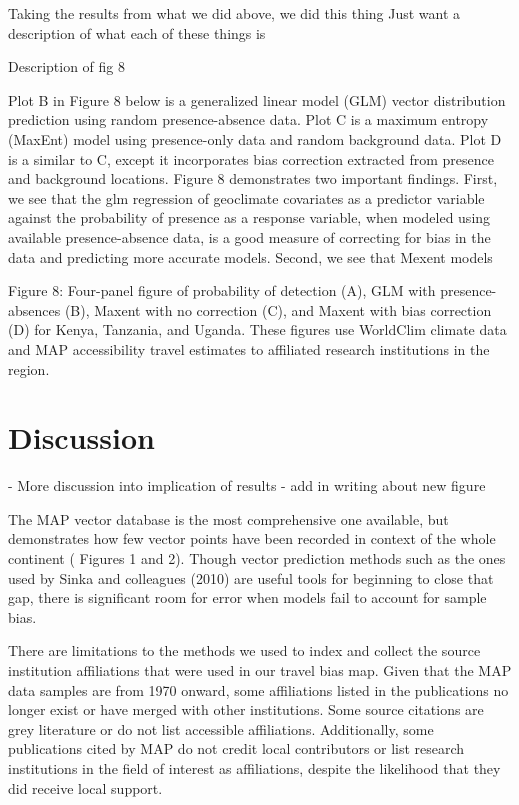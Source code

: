 \documentclass[sn-nature]{sn-jnl}%
\begin{document}
Taking the results from what we did above, we did this thing
Just want a description of what each of these things is

Description of fig 8

Plot B in Figure 8 below is a generalized linear model (GLM) vector distribution prediction using random presence-absence data. Plot C is a maximum entropy (MaxEnt) model using presence-only data and random background data. Plot D is a similar to C, except it incorporates bias correction extracted from presence and background locations. Figure 8 demonstrates two important findings. First, we see that the glm regression of geoclimate covariates as a predictor variable against the probability of presence as a response variable, when modeled using available presence-absence data, is a good measure of correcting for bias in the data and predicting more accurate models. Second, we see that Mexent models 



Figure 8: Four-panel figure of probability of detection (A), GLM with presence-absences (B), Maxent with no correction (C), and Maxent with bias correction (D) for Kenya, Tanzania, and Uganda. These figures use WorldClim climate data and MAP accessibility travel estimates to affiliated research institutions in the region. 


\section*{Discussion}\label{discussion}
- More discussion into implication of results 
- add in writing about new figure

The MAP vector database is the most comprehensive one available, but demonstrates how few vector points have been recorded in context of the whole continent ( Figures 1 and 2). Though vector prediction methods such as the ones used by Sinka and colleagues (2010) are useful tools for beginning to close that gap, there is significant room for error when models fail to account for sample bias.

There are limitations to the methods we used to index and collect the source institution affiliations that were used in our travel bias map. Given that the MAP data samples are from 1970 onward, some affiliations listed in the publications no longer exist or have merged with other institutions. Some source citations are grey literature or do not list accessible affiliations. Additionally, some publications cited by MAP do not credit local contributors or list research institutions in the field of interest as affiliations, despite the likelihood that they did receive local support. 
\end{document}
